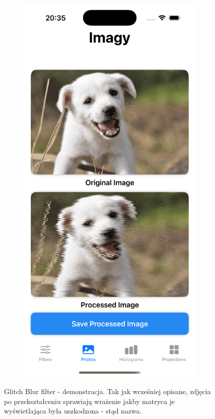\documentclass[a4paper]{article}
\begin{document}
\begin{figure}[H]
\begin{subfigure}{0.2\textwidth}
        \label{fig:dog_glitch}
    \end{subfigure}
    \begin{subfigure}{0.2\textwidth}
        \centering
        \includegraphics[width=\linewidth]{images/dog_glitch.png}
        \label{fig:dog_glitch}
    \end{subfigure}
    \caption{Glitch Blur filter - demonstracja. Tak jak wcześniej opisane, zdjęcia po przekształceniu sprawiają wrażenie jakby matryca je wyświetlająca była uszkodzona - stąd nazwa.}
    \label{fig:glitch}
\end{figure}
\end{document}
